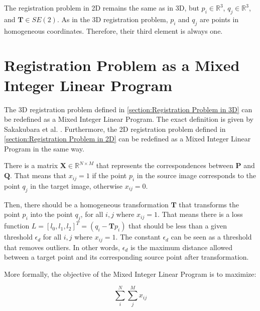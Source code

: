         The registration problem in 2D remains the same as in 3D, but $p_i \in \mathbb{R}^{3}$, $q_j \in \mathbb {R}^{3}$, and $\pmb{T} \in SE(2)$.
        As in the 3D registration problem, $p_i$ and $q_j$ are points in homogeneous coordinates. Therefore, their third element is always one.

    \section{Registration Problem as a Mixed Integer Linear Program}
    \label{section:Registration Problem as Mixed Integer Linear Program}
        The 3D registration problem defined in \autoref{section:Registration Problem in 3D} can be redefined as a Mixed Integer Linear Program.
        The exact definition is given by Sakakubara et al. \cite{Sakakubara_2007_automatic}. Furthermore, the 2D registration problem defined in \autoref{section:Registration Problem in 2D}
        can be redefined as a Mixed Integer Linear Program in the same way.
        
        There is a matrix $\pmb{X} \in \mathbb{R}^{N \times M}$ that represents the correspondences between $\pmb{P}$ and $\pmb{Q}$.
        That means that $x_{ij} = 1$ if the point $p_i$ in the source image corresponds to the point $q_j$ in the target image, otherwise $x_{ij} = 0$.

        Then, there should be a homogeneous transformation $\pmb{T}$ that transforms the point $p_i$ into the point $q_j$, for all $i, j$ where $x_{ij} = 1$.
        That means there is a loss function $L = [l_0, l_1, l_2]^T = (q_i - \pmb{T} p_i)$ that should be less than a given threshold $\epsilon_d$
        for all $i, j$ where $x_{ij} = 1$. The constant $\epsilon_d$ can be seen as a threshold that removes outliers.
        In other words, $\epsilon_d$ is the maximum distance allowed between a target point and its corresponding source point after transformation.

        More formally, the objective of the Mixed Integer Linear Program is to maximize:
        
        \begin{equation}
            \label{eq:objective_original}
            \sum_{i}^{N} \sum_{j}^{M} x_{ij}    
        \end{equation}
        
